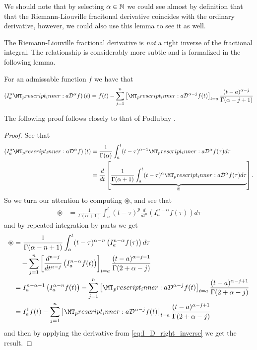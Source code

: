We should note that  by selecting $ \alpha \in \mathbb{N} $ we could see almost by definition that that the Riemann-Liouville fracitonal derivative coincides with the ordinary derivative, however,  we could also use this lemma to see it as well.

The Riemann-Liouville fractional derivative is \emph{not} a right inverse of the fractional integral. The relationship is considerably more subtle and is formalized in the following lemma.
\begin{mdframed}[innertopmargin=10pt]
\begin{lemma}
    \label{lem:rld_right_res}
    For an admissable function $ f $ we have that
    \begin{align}
        \left(I_a^\alpha \prescript{}{a}{\mathcal{D}}^\alpha f\right)(t) = f(t) - \sum_{j=1}^{n} \left[ \prescript{}{a}{\mathcal{D}}^{\alpha - j}f(t)\right]_{t=a} \frac{(t-a)^{\alpha - j}}{\Gamma(\alpha - j + 1)}
    \end{align}
\end{lemma}
\end{mdframed}
The following proof follows closely to that of Podlubny \cite{Podlubny1999}.
\begin{proof}
    See that
    \begin{align}
        \left(I_a^\alpha \prescript{}{a}{\mathcal{D}}^\alpha f\right)(t) &= \frac{1}{\Gamma(\alpha)} \int_a^t (t-\tau)^{\alpha - 1} \prescript{}{a}{\mathcal{D}}^\alpha f(\tau)d\tau \\
    \label{eq:I_D_right_inverse}
    &= \frac{d}{dt} \left[ \underbrace{\frac{1}{\Gamma(\alpha + 1)} \int_a^t (t-\tau)^\alpha \prescript{}{a}{\mathcal{D}}^\alpha f(\tau) d\tau}_{\circledast}\right].
    \end{align}
So we turn our attention to computing $\circledast $,
and see that
    \begin{align}
        \circledast &= \frac{1}{\Gamma(\alpha + 1)} \int_a^t (t-\tau)^p \frac{d}{dt^n} \left( I_a^{n - \alpha} f(\tau)\right) d\tau
    \end{align}
and by repeated integration by parts we get
    \begin{align}
        \circledast &= \frac{1}{\Gamma(\alpha - n + 1)}\int_a^t (t-\tau)^{\alpha - n} \left( I_a^{n - \alpha}f(\tau) \right) d\tau \\
        & \ \ \ - \sum_{j=1}^n \left[ \frac{d^{n-j}}{dt^{n-j}} \left( I_a^{n - \alpha} f(t) \right) \right]_{t=a} \frac{(t-a)^{\alpha - j -1}}{\Gamma(2 + \alpha - j)} \\
        \label{eq:negative_frac_deriv_1}
        &= I_a^{n-\alpha - 1} \left( I_a^{\alpha - n} f(t) \right) - \sum_{j=1}^n \left[ \prescript{}{a}{\mathcal{D}}^{\alpha - j} f(t)\right]_{t=a} \frac{(t-a)^{\alpha - j + 1}}{\Gamma(2 + \alpha - j)} \\
        \label{eq:negative_frac_deriv_2}
        &= I_{a}^{1} f(t) - \sum_{j=1}^n \left[ \prescript{}{a}{\mathcal{D}}^{\alpha - j} f(t) \right]_{t=a} \frac{(t-a)^{\alpha - j + 1}}{\Gamma(2 + \alpha - j)}
    \end{align}
and then 
by applying the derivative from \eqref{eq:I_D_right_inverse} we get the result. 
\end{proof}

